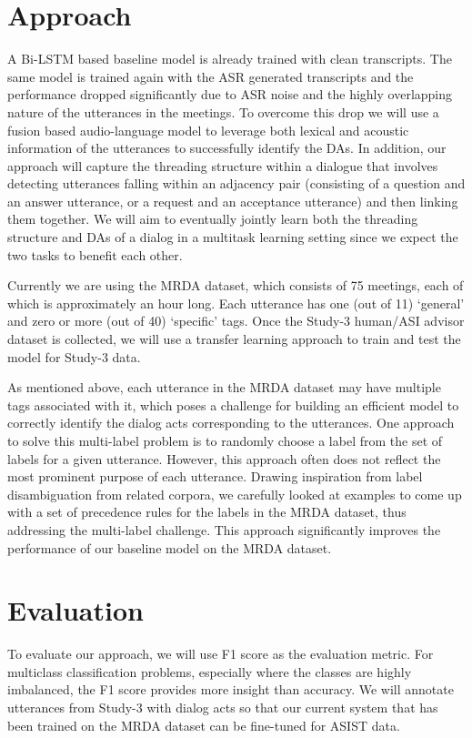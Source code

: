 \section{Approach}

A Bi-LSTM based baseline model is already trained with clean transcripts. The
same model is trained again with the ASR generated transcripts and the
performance dropped significantly due to ASR noise and the highly overlapping
nature of the utterances in the meetings. To overcome this drop we will use a
fusion based audio-language model to leverage both lexical and acoustic
information of the utterances to successfully identify the DAs. In addition,
our approach will capture the threading structure within a dialogue that
involves detecting utterances falling within an adjacency pair (consisting of a
question and an answer utterance, or a request and an acceptance utterance) and
then linking them together. We will aim to eventually jointly learn both the
threading structure and DAs of a dialog in a multitask learning setting since
we expect the two tasks to benefit each other.

Currently we are using the MRDA dataset, which consists of 75 meetings, each of
which is approximately an hour long. Each utterance has one (out of 11)
`general' and zero or more (out of 40) `specific' tags. Once the Study-3
human/ASI advisor dataset is collected, we will use a transfer learning
approach to train and test the model for Study-3 data.

As mentioned above, each utterance in the MRDA dataset may have multiple tags
associated with it, which poses a challenge for building an efficient model to
correctly identify the dialog acts corresponding to the utterances.  One
approach to solve this multi-label problem is to randomly choose a label from
the set of labels for a given utterance. However, this approach often does not
reflect the most prominent purpose of each utterance. Drawing inspiration from
label disambiguation from related corpora, we carefully looked at examples to
come up with a set of precedence rules for the labels in the MRDA dataset, thus
addressing the multi-label challenge. This approach significantly improves the
performance of our baseline model on the MRDA dataset.

\section{Evaluation}

To evaluate our approach, we will use F1 score as the evaluation metric. For
multiclass classification problems, especially where the classes are highly
imbalanced, the F1 score provides more insight than accuracy. We will annotate
utterances from Study-3 with dialog acts so that our current system that has
been trained on the MRDA dataset can be fine-tuned for ASIST data.

